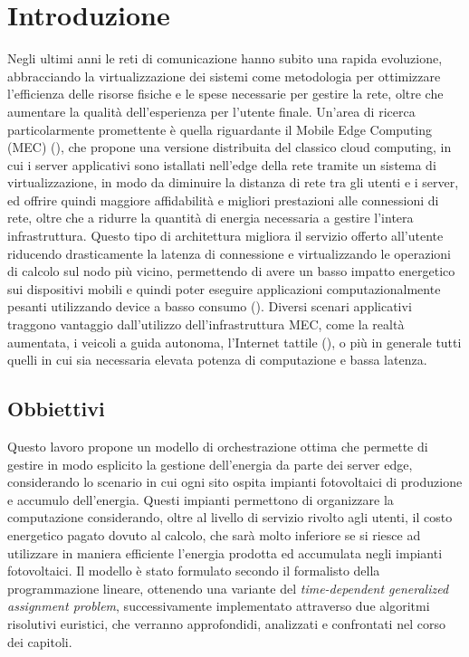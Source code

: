 \chapter{Introduzione}
\label{cap:introduzione}

Negli ultimi anni le reti di comunicazione hanno subito una rapida evoluzione, abbracciando la virtualizzazione dei sistemi come metodologia per ottimizzare l'efficienza delle risorse fisiche e le spese necessarie per gestire la rete, oltre che aumentare la qualità dell'esperienza per l'utente finale. Un'area di ricerca particolarmente promettente è quella riguardante il Mobile Edge Computing (MEC) (\cite{MEC}), che propone una versione distribuita del classico cloud computing, in cui i server applicativi sono istallati nell'edge della rete tramite un sistema di virtualizzazione, in modo da diminuire la distanza di rete tra gli utenti e i server, ed offrire quindi maggiore affidabilità e migliori prestazioni alle connessioni di rete, oltre che a ridurre la quantità di energia necessaria a gestire l'intera infrastruttura. Questo tipo di architettura migliora il servizio offerto all'utente riducendo drasticamente la latenza di connessione e virtualizzando le operazioni di calcolo sul nodo più vicino, permettendo di avere un basso impatto energetico sui dispositivi mobili e quindi poter eseguire applicazioni computazionalmente pesanti utilizzando device a basso consumo (\cite{7901477}). Diversi scenari applicativi traggono vantaggio dall'utilizzo dell'infrastruttura MEC, come la realtà aumentata, i veicoli a guida autonoma, l'Internet tattile (\cite{internet-tattile}), o più in generale tutti quelli in cui sia necessaria elevata potenza di computazione e bassa latenza.


%
%
\section{Obbiettivi}
\label{sec:obbiettivi}

Questo lavoro propone un modello di orchestrazione ottima che permette di gestire in modo esplicito la gestione dell'energia da parte dei server edge, considerando lo scenario in cui ogni sito ospita impianti fotovoltaici di produzione e accumulo dell'energia. Questi impianti permettono di organizzare la computazione considerando, oltre al livello di servizio rivolto agli utenti, il costo energetico pagato dovuto al calcolo, che sarà molto inferiore se si riesce ad utilizzare in maniera efficiente l'energia prodotta ed accumulata negli impianti fotovoltaici. Il modello è stato formulato secondo il formalisto della programmazione lineare, ottenendo una variante del \textit{time-dependent generalized assignment problem}, successivamente implementato attraverso due algoritmi risolutivi euristici, che verranno approfondidi, analizzati e confrontati nel corso dei capitoli.


